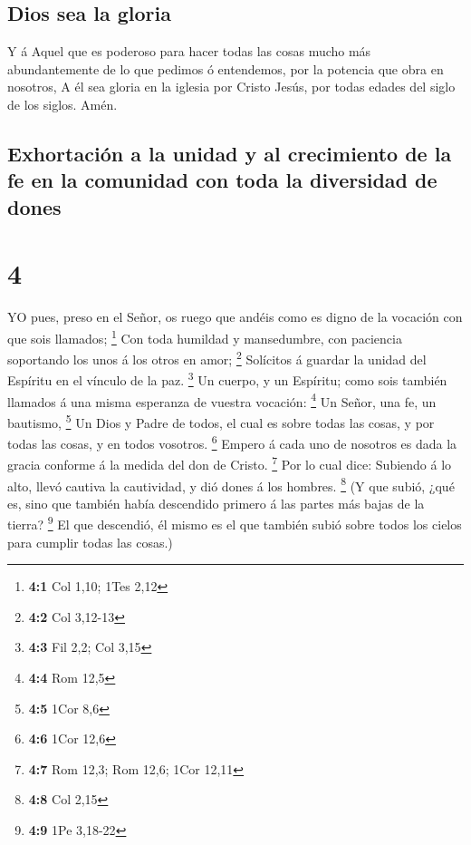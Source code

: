 \hypertarget{dios-sea-la-gloria}{%
\subsection{Dios sea la gloria}\label{dios-sea-la-gloria}}

 Y á Aquel que es poderoso para hacer todas las cosas mucho
más abundantemente de lo que pedimos ó entendemos, por la potencia que
obra en nosotros,  A él sea gloria en la iglesia por Cristo
Jesús, por todas edades del siglo de los siglos. Amén.

\hypertarget{exhortaciuxf3n-a-la-unidad-y-al-crecimiento-de-la-fe-en-la-comunidad-con-toda-la-diversidad-de-dones}{%
\subsection{Exhortación a la unidad y al crecimiento de la fe en la
comunidad con toda la diversidad de
dones}\label{exhortaciuxf3n-a-la-unidad-y-al-crecimiento-de-la-fe-en-la-comunidad-con-toda-la-diversidad-de-dones}}

\hypertarget{section-3}{%
\section{4}\label{section-3}}

 YO pues, preso en el Señor, os ruego que andéis como es
digno de la vocación con que sois llamados; \footnote{\textbf{4:1} Col
  1,10; 1Tes 2,12}  Con toda humildad y mansedumbre, con
paciencia soportando los unos á los otros en amor; \footnote{\textbf{4:2}
  Col 3,12-13}  Solícitos á guardar la unidad del Espíritu
en el vínculo de la paz. \footnote{\textbf{4:3} Fil 2,2; Col 3,15}
 Un cuerpo, y un Espíritu; como sois también llamados á una
misma esperanza de vuestra vocación: \footnote{\textbf{4:4} Rom 12,5}
 Un Señor, una fe, un bautismo, \footnote{\textbf{4:5} 1Cor
  8,6}  Un Dios y Padre de todos, el cual es sobre todas las
cosas, y por todas las cosas, y en todos vosotros. \footnote{\textbf{4:6}
  1Cor 12,6}  Empero á cada uno de nosotros es dada la
gracia conforme á la medida del don de Cristo. \footnote{\textbf{4:7}
  Rom 12,3; Rom 12,6; 1Cor 12,11}  Por lo cual dice:
Subiendo á lo alto, llevó cautiva la cautividad, y dió dones á los
hombres. \footnote{\textbf{4:8} Col 2,15}  (Y que subió,
¿qué es, sino que también había descendido primero á las partes más
bajas de la tierra? \footnote{\textbf{4:9} 1Pe 3,18-22}  El
que descendió, él mismo es el que también subió sobre todos los cielos
para cumplir todas las cosas.)

